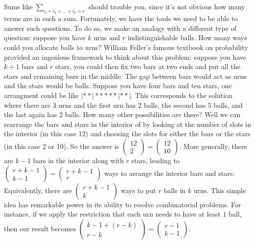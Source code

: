 Sums like $\sum_{i_{1}+i_{2}+\ldots+i_{k}=r}$ should trouble you,
since it's not obvious how many terms are in such a sum. Fortunately,
we have the tools we need to be able to answer such questions. To
do so, we make an analogy with a different type of question: suppose
you have $k$ urns and $r$ indistinguishable balls. How many ways
could you allocate balls to urns? William Feller's famous textbook
on probability provided an ingenious framework to think about this
problem: suppose you have $k+1$ bars and $r$ stars, you could then
fix two bars at two ends and put all the stars and remaining bars
in the middle. The gap between bars would act as urns and the stars
would be balls. Suppose you have four bars and ten stars, one arrangment
could be like $|**|*****|**|$. This corresponds to the solution where
there are $3$ urns and the first urn has $2$ balls, the second has
$5$ balls, and the last again has 2 balls. How many other possibilities
are there? Well we can rearrange the bars and stars in the interior
of by looking at the number of slots in the interior (in this case
12) and choosing the slots for either the bars or the stars (in this
case 2 or 10). So the answer is $\left(\begin{array}{c}
12\\
2
\end{array}\right)=\left(\begin{array}{c}
12\\
10
\end{array}\right)$. More generally, there are $k-1$ bars in the interior along with
$r$ stars, leading to $\left(\begin{array}{c}
r+k-1\\
k-1
\end{array}\right)=\left(\begin{array}{c}
r+k-1\\
r
\end{array}\right)$ ways to arrange the interior bars and stars. Equivalently, there
are $\left(\begin{array}{c}
r+k-1\\
k
\end{array}\right)$ ways to put $r$ balls in $k$ urns. This simple idea has remarkable
power in its ability to resolve combinatorial problems. For instance,
if we apply the restriction that each urn needs to have at least $1$
ball, then our result becomes $\left(\begin{array}{c}
k-1+(r-k)\\
r-k
\end{array}\right)=\left(\begin{array}{c}
r-1\\
k-1
\end{array}\right).$
